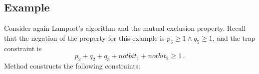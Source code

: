 




\subsection{Example}

Consider again Lamport's algorithm and the mutual
exclusion property. Recall that the negation of the property for this example is $p_3 \ge 1 \land q_5 \ge 1$, and the trap constraint is
$$p_2 + q_2 + q_3 + notbit_1 + notbit_2 \ge 1\,.$$
%
Method \invariantref{} constructs the following constraints: 


